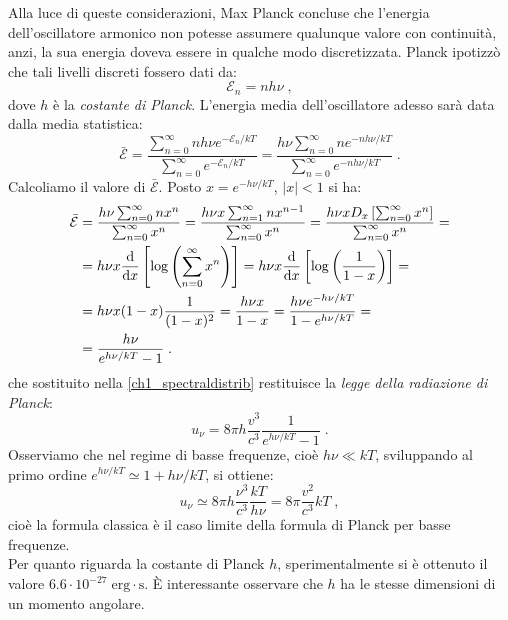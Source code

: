 \documentclass[10pt,a4paper]{report}
\theoremstyle{definition}
\numberwithin{equation}{section}
\newcommand{\diff}[1][]{\mathrm{d}#1}
\begin{document}
Alla luce di queste considerazioni, Max Planck concluse che l'energia dell'oscillatore armonico non potesse assumere qualunque valore con continuità, anzi, la sua energia doveva essere in qualche modo discretizzata. Planck ipotizzò che tali livelli discreti fossero dati da:
\begin{equation}
\mathcal{E}_n = nh\nu\;,
\end{equation}
dove $h$ è la \textit{costante di Planck}. L'energia media dell'oscillatore adesso sarà data dalla media statistica:
\begin{equation}
\bar{\mathcal{E}}=\frac{\sum_{n=0}^{\infty}nh\nu e^{-\mathcal{E}_n/kT}}{\sum_{n=0}^{\infty}e^{-\mathcal{E}_n/kT}}=\frac{h\nu\sum_{n=0}^{\infty}n e^{-nh\nu/kT}}{\sum_{n=0}^{\infty} e^{-nh\nu/kT}}\;.
\end{equation}
Calcoliamo il valore di $\bar{\mathcal{E}}$. Posto $x=e^{-h\nu/kT}$, $|x|<1$ si ha:
\begin{align}
\bar{\mathcal{E}} &= \frac{h\nu\sum_{n=0}^{\infty}n x^n}{\sum_{n=0}^{\infty} x^n}=\frac{h\nu x\sum_{n=1}^{\infty}n x^{n-1}}{\sum_{n=0}^{\infty} x^n}=\frac{h\nu x D_x\left[\sum_{n=0}^{\infty} x^n\right]}{\sum_{n=0}^{\infty} x^n} = \notag \\
&= h\nu x \frac{\mathrm{d}}{\diff{x}}\left[\log\left(\sum_{n=0}^{\infty} x^n\right)\right]=
h\nu x \frac{\mathrm{d}}{\diff{x}}\left[\log\left(\frac{1}{1-x}\right)\right]= \notag \\
&= h\nu x (1-x)\frac{1}{(1-x)^2}=\frac{h\nu x}{1-x}=\frac{h\nu e^{-h\nu/kT}}{1-e^{h\nu/kT}}= \notag \\
&= \frac{h\nu}{e^{h\nu/kT}-1}\;.
\end{align}
che sostituito nella \eqref{ch1_spectraldistrib} restituisce la \textit{legge della radiazione di Planck}:
\begin{equation}
u_{\nu}=8\pi h\frac{v^3}{c^3}\frac{1}{e^{h\nu/kT}-1}\;. \label{ch1_plancklaw}
\end{equation}
Osserviamo che nel regime di basse frequenze, cioè $h\nu\ll kT$, sviluppando al primo ordine $e^{h\nu/kT}\simeq 1+h\nu/kT$, si ottiene:
$$
u_{\nu}\simeq 8\pi h\frac{\nu^3}{c^3}\frac{kT}{h\nu}=8\pi \frac{v^2}{c^3}kT\;,
$$
cioè la formula classica è il caso limite della formula di Planck per basse frequenze. \\
Per quanto riguarda la costante di Planck $h$, sperimentalmente si è ottenuto il valore $6.6 \cdot 10^{-27}\; \mathrm{erg\cdot s}$. È interessante osservare che $h$ ha le stesse dimensioni di un momento angolare.
\end{document}

